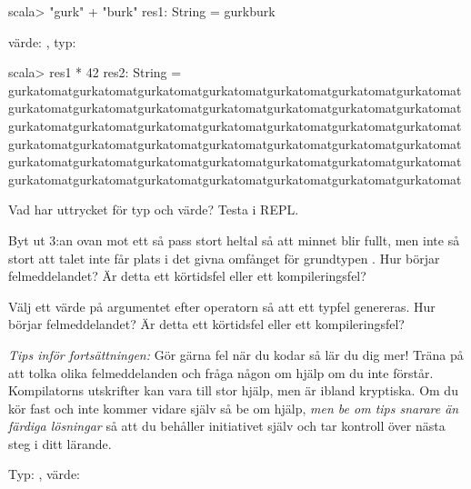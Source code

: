 \SOLUTION

\TaskSolved \what

\SubtaskSolved
\begin{REPLnonum}
scala> "gurk" + "burk"
res1: String = gurkburk
\end{REPLnonum}
värde: , typ:  

\SubtaskSolved
\begin{REPLnonum}
scala> res1 * 42
res2: String = gurkatomatgurkatomatgurkatomatgurkatomatgurkatomatgurkatomatgurkatomatgurkatomatgurkatomatgurkatomatgurkatomatgurkatomatgurkatomatgurkatomatgurkatomatgurkatomatgurkatomatgurkatomatgurkatomatgurkatomatgurkatomatgurkatomatgurkatomatgurkatomatgurkatomatgurkatomatgurkatomatgurkatomatgurkatomatgurkatomatgurkatomatgurkatomatgurkatomatgurkatomatgurkatomatgurkatomatgurkatomatgurkatomatgurkatomatgurkatomatgurkatomatgurkatomat
\end{REPLnonum}

\QUESTEND





\QUESTBEGIN

\Task \what

\Subtask Vad har uttrycket  för typ och värde? Testa i REPL.

\Subtask Byt ut 3:an ovan mot ett så pass stort heltal så att minnet blir fullt, 
men inte så stort att talet inte får plats i det givna omfånget för grundtypen . Hur börjar felmeddelandet? Är detta ett körtidsfel eller ett kompileringsfel?

\Subtask Välj ett värde på argumentet efter operatorn \code{*} så att ett typfel genereras. Hur börjar felmeddelandet? Är detta ett körtidsfel eller ett kompileringsfel?

\begin{framed}
\noindent\emph{Tips inför fortsättningen:} Gör gärna fel när du kodar så lär du dig mer! Träna på att tolka olika felmeddelanden och fråga någon om hjälp om du inte förstår. Kompilatorns utskrifter kan vara till stor hjälp, men är ibland kryptiska. Om du kör fast och inte kommer vidare själv så be om hjälp, \emph{men be om tips snarare än färdiga lösningar} så att du behåller initiativet själv och tar kontroll över nästa steg i ditt lärande.
\end{framed}


\SOLUTION

\TaskSolved \what

\SubtaskSolved Typ: , värde: 

